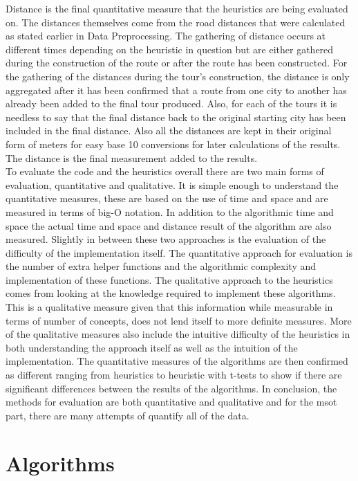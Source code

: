 \documentclass[midd]{thesis}
\newcommand{\tab}{\hspace*{2em}}
\begin{document}
\tab Distance is the final quantitative measure that the heuristics are being evaluated on. The distances themselves come from the road distances that were calculated as stated earlier in Data Preprocessing. The gathering of distance occurs at different times depending on the heuristic in question but are either gathered during the construction of the route or after the route has been constructed. For the gathering of the distances during the tour's construction, the distance is only aggregated after it has been confirmed that a route from one city to another has already been added to the final tour produced. Also, for each of the tours it is needless to say that the final distance back to the original starting city has been included in the final distance. Also all the distances are kept in their original form of meters for easy base 10 conversions for later calculations of the results. The distance is the final measurement added to the results.\\
\tab To evaluate the code and the heuristics overall there are two main forms of evaluation, quantitative and qualitative. It is simple enough to understand the quantitative measures, these are based on the use of time and space and are measured in terms of big-O notation. In addition to the algorithmic time and space the actual time and space and distance result of the algorithm are also measured. Slightly in between these two approaches is the evaluation of the difficulty of the implementation itself. The quantitative approach for evaluation is the number of extra helper functions and the algorithmic complexity and implementation of these functions. The qualitative approach to the heuristics comes from looking at the knowledge required to implement these algorithms. This is a qualitative measure given that this information while measurable in terms of number of concepts, does not lend itself to more definite measures. More of the qualitative measures also include the intuitive difficulty of the heuristics in both understanding the approach itself as well as the intuition of the implementation. The quantitative measures of the algorithms are then confirmed as different ranging from heuristics to heuristic with t-tests to show if there are significant differences between the results of the algorithms. In conclusion, the methods for evaluation are both quantitative and qualitative and for the msot part, there are many attempts of quantify all of the data.

\chapter{Algorithms}
\end{document}
